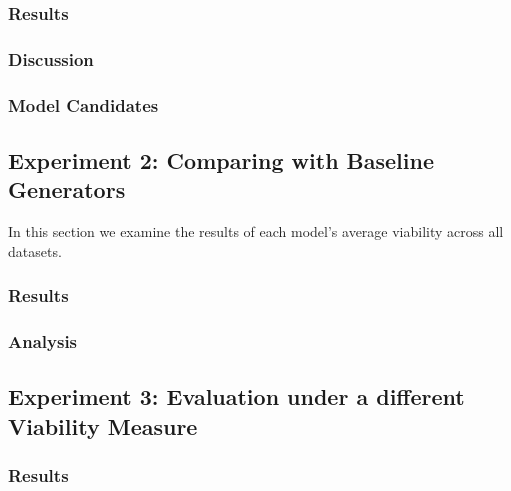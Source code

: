 \documentclass[runningheads]{llncs}
\begin{document}
\subsubsection{Results}

\subsubsection{Discussion}

\subsubsection{Model Candidates}




\subsection{Experiment 2: Comparing with Baseline Generators}
\label{sec:experiment2}
In this section we examine the results of each model's average viability across all datasets. 
\subsubsection{Results}


\subsubsection{Analysis}




\subsection{Experiment 3: Evaluation under a different Viability Measure}
\label{sec:experiment3}
\subsubsection{Results}

\end{document}
